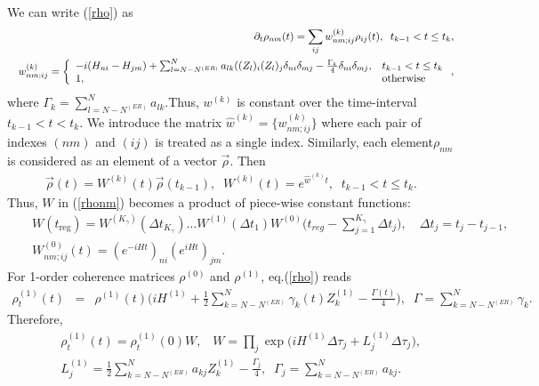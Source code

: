 \documentclass[pra,preprint,showpacs]{revtex4-1}
\begin{document}
We can write (\ref{rho}) as
\begin{eqnarray}
\label{rhonm2}
&&
\partial_t\rho_{nm}(t) = \sum_{ij} w^{(k)}_{nm;ij}\rho_{ij}(t), \;\; t_{k-1} < t \le t_k,\\\nonumber
&&
w^{(k)}_{nm;ij}=\left\{
\begin{array}{ll}
 -i (H_{ni} - H_{jm}) + \sum_{l=N-N^{(ER)}}^N a_{lk} ((Z_l)_i (Z_l)_j \delta_{ni}\delta_{mj} - \frac{\Gamma_k}{4} \delta_{ni}\delta_{mj},& t_{k-1}<t\le t_k\cr
1,& {\mbox{otherwise}}\end{array}\right.,
\end{eqnarray}
where $\Gamma_k = \sum_{l=N-N^{(ER)}}^N a_{lk}$.Thus,   $w^{(k)}$ is constant over the  time-interval $t_{k-1}<t<t_k$.
 We introduce the matrix $\hat w^{(k)} =\{w^{(k)}_{nm;ij}\}$  where each pair of indexes $(nm)$ and $(ij)$ is treated as a single index. Similarly, each element$\rho_{nm}$is considered as an element of a vector $\vec{\rho}$.
Then
 \begin{eqnarray}\label{rhoT}
 \vec{\rho}(t) = W^{(k)}(t) \vec{\rho}(t_{k-1}),\;\; W^{(k)}(t)=e^{\hat w^{(k)} t}, \;\; t_{k-1} < t \le t_k.
 \end{eqnarray}
Thus, $W$ in (\ref{rhonm})  becomes a product of piece-wise constant functions: %
\begin{eqnarray}\label{UtK}
&&
W(t_{\mathrm{reg}})=  W^{(K_\gamma)}(\Delta t_{K_\gamma})\dots W^{(1)}(\Delta t_1) W^{(0)}\Big(t_{reg} - \sum_{j=1}^{K_\gamma} \Delta t_j\Big) ,\quad  \Delta t_j = t_j -t_{j-1},\\\label{W0}
&&W^{(0)}_{nm;ij}(t) =\left( e^{-iHt} \right)_{ni}
\left( e^{iH t} \right)_{jm}.
\end{eqnarray}
\iffalse
For 1-order coherence matrices $\rho^{(0)}$ and $\rho^{(1)}$, eq.(\ref{rho}) reads
\begin{eqnarray}\label{rho01coh}
 \rho^{(1)}_t(t)&=&\rho^{(1)}(t) \Big(i H^{(1)}+  \frac{1}{2}   \sum_{k=N-N^{(ER)}}^N\gamma_k (t)Z^{(1)}_{k}
-\frac{\Gamma(t)}{4}\Big) ,\;\;\Gamma=\sum_{k=N-N^{(ER)}}^N \gamma_k.
\end{eqnarray}
Therefore,
\begin{eqnarray}
&&\rho^{(1)}_t(t) =  \rho^{(1)}_t(0)  W,\;\;\; W=\prod_{j} \exp\Big( i H^{(1)}\Delta \tau_j + L^{(1)}_j \Delta \tau_j  \Big), \\\nonumber
&&L^{(1)}_j=  \frac{1}{2}   \sum_{k=N-N^{(ER)}}^N a_{kj}Z^{(1)}_{k}
-\frac{\Gamma_j}{4},\;\;\Gamma_j=\sum_{k=N-N^{(ER)}}^N a_{kj}.
\end{eqnarray}
\end{document}

